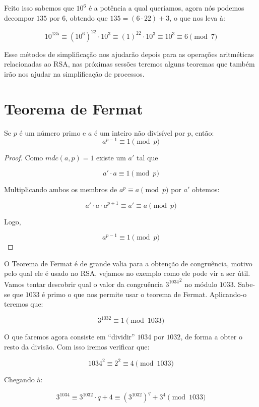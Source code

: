 Feito isso sabemos que $10^6$ \'e a pot\^encia a qual quer\'iamos, agora n\'os podemos decompor $135$ por $6$, obtendo que $135 = (6 \cdot 22) + 3$, o que nos leva \`{a}:

$$10^{135} \equiv (10^6)^{22} \cdot 10^3 \equiv (1)^{22} \cdot 10^3 \equiv 10^3 \equiv 6 \pmod{7}$$

Esse m\'etodos de simplifica\c{c}\~ao nos ajudar\~ao depois para as opera\c{c}\~oes aritm\'eticas relacionadas ao RSA, nas pr\'oximas sess\~oes teremos alguns teoremas que tamb\'em ir\~ao nos ajudar na simplifica\c{c}\~ao de processos.

\section{Teorema de Fermat}

\begin{Th}\label{fermat}
Se $p$ \'e um n\'umero primo e $a$ \'e um inteiro n\~ao divis\'ivel por $p$, ent\~ao:
$$a^{p-1}\equiv 1 \pmod{p}$$
\end{Th}

\begin{proof}
Como $mdc(a,p)=1$ existe um $a'$ tal que

$$a' \cdot a \equiv 1 \pmod{p}$$

Multiplicando ambos os membros de $a^p \equiv a \pmod{p}$ por $a'$ obtemos:

$$a' \cdot a \cdot a^{p+1} \equiv a' \equiv a \pmod{p}$$

Logo,

$$a^{p-1} \equiv 1 \pmod{p}$$
\end{proof}

O Teorema de Fermat \'e de grande valia para a obten\c{c}\~{a}o de congru\^encia, motivo pelo qual ele \'e usado no RSA, vejamos no exemplo como ele pode vir a ser \'util. Vamos tentar descobrir qual o valor da congru\^encia ${3^{1034}}^{2}$ no m\'odulo $1033$. Sabe-se que $1033$ \'e primo o que nos permite usar o teorema de Fermat. Aplicando-o teremos que:

$$3^{1032} \equiv 1 \pmod{1033}$$

O que faremos agora consiste em ``dividir'' $1034$ por $1032$, de forma a obter o resto da divis\~ao. Com isso iremos verificar que:

$$1034^2 \equiv 2^2 \equiv 4 \pmod{1033}$$

Chegando \`a:

$$3^{1034} \equiv 3^{1032}\cdot q + 4 \equiv (3^{1032})^{q} + 3^4 \pmod{1033}$$


